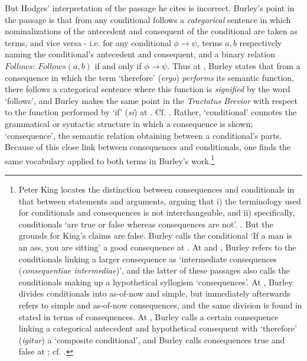 \documentclass[]{birkjour}
\begin{document}
{But Hodges' interpretation of the passage he cites is incorrect. Burley's point in the passage is that from any conditional follows a \textit{categorical} sentence in which nominalizations of the antecedent and consequent of the conditional are taken as terms, and vice versa - i.e. for any conditional $\phi \rightarrow \psi$, terms $a, b$ respectively naming the conditional's antecedent and consequent, and a binary relation $Follows$: $Follows(a, b)$ if and only if $\phi \rightarrow \psi$. Thus at \autocite[p. 141.26-30]{BurleyDPAL}, Burley states that from a consequence in which the term `therefore' (\textit{ergo}) \textit{performs} its semantic function, there follows a categorical sentence where this function is \textit{signified} by the word `follows', and Burley makes the same point in the \textit{Tractatus Brevior} with respect to the function performed by `if' (\textit{si}) at \autocite[p. 219.1-9]{BurleyDPAL}. Cf. \autocite[p. 143, par. 119]{Green-Pedersen1980b}.} Rather, `conditional' connotes the grammatical or syntactic structure in which a consequence is shown; `consequence', the semantic relation obtaining between a conditional's parts. Because of this close link between consequences and conditionals, one finds the same vocabulary applied to both terms in Burley's work.\footnote{Peter King locates the distinction between consequences and conditionals in that between statements and arguments, arguing that i) the terminology used for conditionals and consequences is not interchangeable, and ii) specifically, conditionals `are true or false whereas consequences are not'. \autocite[p. 120]{King2001}. But the grounds for King's claims are false. Burley calls the conditional `If a man is an ass, you are sitting' a good consequence at \autocite[p. 61]{BurleyDPAL}. At \autocite[p. 114, par. 8]{Green-Pedersen1980b} and \autocite[p. 89.1-31]{BurleyDPAL}, Burley refers to the conditionals linking a larger consequence as `intermediate consequences (\textit{consequentiae intermediae})', and the latter of these passages also calls the conditionals making up a hypothetical syllogism `consequences'. At \autocite[p. 128, par. 68]{Green-Pedersen1980b}, Burley divides conditionals into as-of-now and simple, but immediately afterwards refers to simple and as-of-now consequences, and the same division is found in \autocite[pp. 60.28-61.5]{BurleyDPAL} stated in terms of consequences. At \autocite[p. 78.27-30]{BurleyDPAL}, Burley calls a certain consequence linking a categorical antecedent and hypothetical consequent with `therefore' (\textit{igitur}) a `composite conditional', and Burley calls consequences true and false at \autocite[p. 113, par. 2-3]{Green-Pedersen1980b}; cf. \autocite[p. 15, par. 19]{Green-Pedersen1980a}.} 
				
\end{document}
